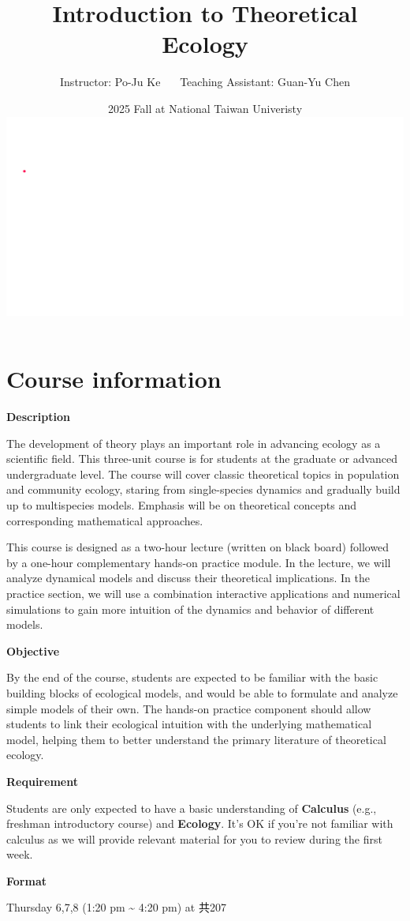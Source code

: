 \documentclass[
]{book}
\title{Introduction to Theoretical Ecology}
\author{Instructor: Po-Ju Ke \(~~~~~\) Teaching Assistant: Guan-Yu Chen}
\date{2025 Fall at National Taiwan Univeristy \includegraphics{./bifurcation.gif}}
\begin{document}
\maketitle

{
\setcounter{tocdepth}{1}
\tableofcontents
}
\hypertarget{course-information}{%
\chapter*{Course information}\label{course-information}}

\textbf{Description}

The development of theory plays an important role in advancing ecology as a scientific field. This three-unit course is for students at the graduate or advanced undergraduate level. The course will cover classic theoretical topics in population and community ecology, staring from single-species dynamics and gradually build up to multispecies models. Emphasis will be on theoretical concepts and corresponding mathematical approaches.

This course is designed as a two-hour lecture (written on black board) followed by a one-hour complementary hands-on practice module. In the lecture, we will analyze dynamical models and discuss their theoretical implications. In the practice section, we will use a combination interactive applications and numerical simulations to gain more intuition of the dynamics and behavior of different models.

\textbf{Objective}

By the end of the course, students are expected to be familiar with the basic building blocks of ecological models, and would be able to formulate and analyze simple models of their own. The hands-on practice component should allow students to link their ecological intuition with the underlying mathematical model, helping them to better understand the primary literature of theoretical ecology.

\textbf{Requirement}

Students are only expected to have a basic understanding of \textbf{Calculus} (e.g., freshman introductory course) and \textbf{Ecology}. It's OK if you're not familiar with calculus as we will provide relevant material for you to review during the first week.

\textbf{Format}

Thursday 6,7,8 (1:20 pm \textasciitilde{} 4:20 pm) at 共207
\end{document}
